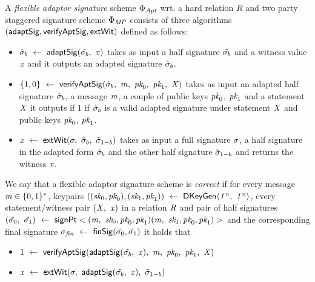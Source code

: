 \begin{definition}
A \emph{flexible adaptor signature} scheme $\Phi_{\mathit{Apt}}$ wrt. a hard relation $R$ and two party staggered signature scheme $\Phi_{\mathit{MP}}$ consists of three algorithms $(\mathsf{adaptSig}, \mathsf{verifyAptSig}, \mathsf{extWit})$ defined as follows:


\begin{itemize}
        \item $\hat{\sigma}_b ~\leftarrow~ \mathsf{adaptSig}(\tilde{\sigma_b} ,~ \mathit{x})$ takes as input a half signature $\tilde{\sigma_b}$ and a witness value $\mathit{x}$ and it outputs an adapted signature $\hat{\sigma}_b$. 
        \item $\{1,0\} ~\leftarrow~ \mathsf{verifyAptSig}(\hat{\sigma}_b ,~ \mathit{m} ,~ \textit{pk}_0 ,~ \textit{pk}_1 ,~ \mathit{X})$ takes as input an adapted half signature $\hat{\sigma}_b$, a message $\mathit{m}$, a couple of public keys $\textit{pk}_0$, $\textit{pk}_1$ and a statement $\mathit{X}$ it outputs if $1$ if $\hat{\sigma}_b$ is a valid adapted signature under statement $\mathit{X}$ and public keys $\textit{pk}_0$, $\textit{pk}_1$. 
        \item $\mathit{x} ~\leftarrow~ \mathsf{extWit}(\sigma ,~ \hat{\sigma}_b ,~ \tilde{\sigma}_{1-b})$ takes as input a full signature $\sigma$, a half signature in the adapted form $\hat{\sigma}_b$ and the other half signature $\tilde{\sigma}_{1-b}$ and returns the witness $\mathit{x}$.
    \end{itemize}

\end{definition}




\begin{definition}
We say that a flexible adaptor signature scheme is \emph{correct} if for every message $\mathit{m} \in \{0,1\}^{*}$, keypairs $((\textit{sk}_0, \textit{pk}_0), (\textit{sk}_1, \textit{pk}_1)) ~\leftarrow~ \mathsf{DKeyGen}\langle \mathit{1^n} ,~ \mathit{1^n} \rangle$, every statement/witness pair $(\mathit{X} ,~ \mathit{x})$ in a relation $\mathit{R}$ and pair of half signatures $(\tilde{\sigma_0} ,~ \tilde{\sigma_1}) ~\leftarrow~ \mathsf{signPt}<(\mathit{m} ,~ \textit{sk}_0, \textit{pk}_0, \textit{pk}_1)(\mathit{m} ,~ \textit{sk}_1, \textit{pk}_0, \textit{pk}_1)>$ and the corresponding final signature $\sigma_{\mathit{fin}} ~\leftarrow~ \mathsf{finSig}(\tilde{\sigma_0},\tilde{\sigma_1})$ it holds that 
	
	\begin{itemize}
		\item $1 ~\leftarrow~ \mathsf{verifyAptSig}(\mathsf{adaptSig}(\tilde{\sigma_b} ,~ \mathit{x}) ,~ \mathit{m} ,~ \textit{pk}_0 ,~ \textit{pk}_1 ,~ \mathit{X})$
		\item $\mathit{x} ~\leftarrow~ \mathsf{extWit}(\sigma ,~ \mathsf{adaptSig}(\tilde{\sigma_b} ,~ \mathit{x}) ,~ \tilde{\sigma}_{1-b})$
	\end{itemize}

\end{definition}


